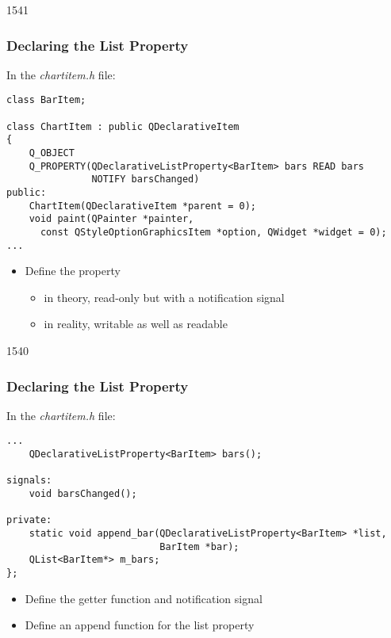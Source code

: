 \begin{slide}[fragile]{1541}\frametitle{Declaring the List Property}

In the \textit{chartitem.h} file:

\vspace*{0.5em}
\begin{lstlisting}
class BarItem;

class ChartItem : public QDeclarativeItem
{
    Q_OBJECT
    Q_PROPERTY(QDeclarativeListProperty<BarItem> bars READ bars
               NOTIFY barsChanged)
public:
    ChartItem(QDeclarativeItem *parent = 0);
    void paint(QPainter *painter,
      const QStyleOptionGraphicsItem *option, QWidget *widget = 0);
...
\end{lstlisting}

\vspace*{0.5em}
\begin{itemize}
\item Define the  property
  \begin{itemize}
  \item in theory, read-only but with a notification signal
  \item in reality, writable as well as readable
  \end{itemize}
\end{itemize}

\end{slide}

\begin{slide}[fragile]{1540}\frametitle{Declaring the List Property}

In the \textit{chartitem.h} file:

\vspace*{0.5em}
\begin{lstlisting}
...
    QDeclarativeListProperty<BarItem> bars();

signals:
    void barsChanged();

private:
    static void append_bar(QDeclarativeListProperty<BarItem> *list,
                           BarItem *bar);
    QList<BarItem*> m_bars;
};
\end{lstlisting}

\vspace*{0.5em}
\begin{itemize}
\item Define the getter function and notification signal
\item Define an append function for the list property
\end{itemize}

\end{slide}

